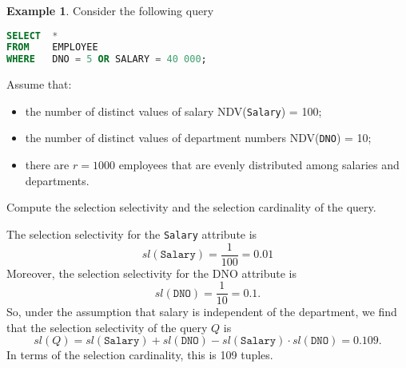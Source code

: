 \documentclass[a4paper, openany]{memoir}
\theoremstyle{definition}
\newtheorem{example}[subsection]{Example}
\begin{document}
\begin{example}
    Consider the following query
\begin{lstlisting}[language=SQL]
SELECT  * 
FROM    EMPLOYEE
WHERE   DNO = 5 OR SALARY = 40 000;
\end{lstlisting}
Assume that:
\begin{itemize}
    \item the number of distinct values of salary NDV(\texttt{Salary}) = 100;
    \item the number of distinct values of department numbers NDV(\texttt{DNO}) = 10;
    \item there are $r = 1000$ employees that are evenly distributed among salaries and departments.
\end{itemize}
Compute the selection selectivity and the selection cardinality of the query.    
\end{example}
\begin{answer}
    The selection selectivity for the \texttt{Salary} attribute is
    \[\textit{sl}(\texttt{Salary}) = \frac{1}{100} = 0.01\]
    Moreover, the selection selectivity for the DNO attribute is
    \[\textit{sl}(\texttt{DNO}) = \frac{1}{10} = 0.1.\]
    So, under the assumption that salary is independent of the department, we find that the selection selectivity of the query $Q$ is
    \[\textit{sl}(Q) = \textit{sl}(\texttt{Salary}) + \textit{sl}(\texttt{DNO}) - \textit{sl}(\texttt{Salary}) \cdot \textit{sl}(\texttt{DNO}) = 0.109.\]
    In terms of the selection cardinality, this is 109 tuples.
\end{answer}
\end{document}
